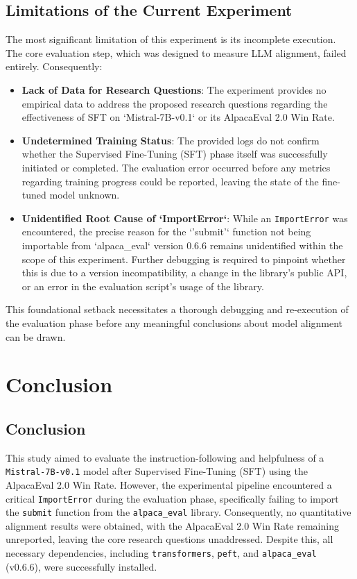 \documentclass[11pt]{article}
\begin{document}
\subsection{Limitations of the Current Experiment}
The most significant limitation of this experiment is its incomplete execution. The core evaluation step, which was designed to measure LLM alignment, failed entirely. Consequently:
\begin{itemize}
    \item \textbf{Lack of Data for Research Questions}: The experiment provides no empirical data to address the proposed research questions regarding the effectiveness of SFT on `Mistral-7B-v0.1` or its AlpacaEval 2.0 Win Rate.
    \item \textbf{Undetermined Training Status}: The provided logs do not confirm whether the Supervised Fine-Tuning (SFT) phase itself was successfully initiated or completed. The evaluation error occurred before any metrics regarding training progress could be reported, leaving the state of the fine-tuned model unknown.
    \item \textbf{Unidentified Root Cause of `ImportError`}: While an \texttt{ImportError} was encountered, the precise reason for the `'submit'` function not being importable from `alpaca_eval` version 0.6.6 remains unidentified within the scope of this experiment. Further debugging is required to pinpoint whether this is due to a version incompatibility, a change in the library's public API, or an error in the evaluation script's usage of the library.
\end{itemize}
This foundational setback necessitates a thorough debugging and re-execution of the evaluation phase before any meaningful conclusions about model alignment can be drawn.

\section{Conclusion}

\subsection{{Conclusion}}
This study aimed to evaluate the instruction-following and helpfulness of a \texttt{{Mistral-7B-v0.1}} model after Supervised Fine-Tuning (SFT) using the AlpacaEval 2.0 Win Rate. However, the experimental pipeline encountered a critical \texttt{{ImportError}} during the evaluation phase, specifically failing to import the \texttt{{submit}} function from the \texttt{{alpaca\_eval}} library. Consequently, no quantitative alignment results were obtained, with the AlpacaEval 2.0 Win Rate remaining unreported, leaving the core research questions unaddressed. Despite this, all necessary dependencies, including \texttt{{transformers}}, \texttt{{peft}}, and \texttt{{alpaca\_eval}} (v0.6.6), were successfully installed.
\end{document}

